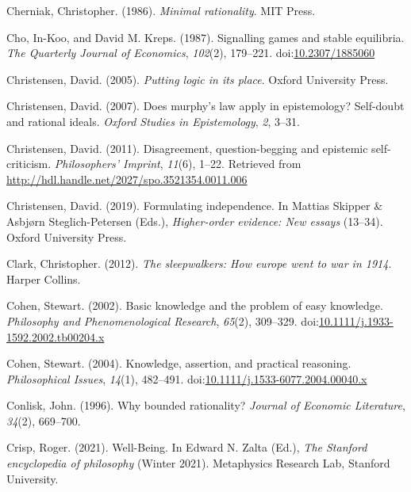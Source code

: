 \documentclass[
  10pt,
  letterpaper,
  twoside]{scrbook}
\newlength{\cslhangindent}
\newenvironment{CSLReferences}[2] %
 {\begin{list}{}{%
  \setlength{\itemindent}{0pt}
  \setlength{\leftmargin}{0pt}
  \setlength{\parsep}{0pt}
  \ifodd #1
   \setlength{\leftmargin}{\cslhangindent}
   \setlength{\itemindent}{-1\cslhangindent}
  \fi
  \setlength{\itemsep}{#2\baselineskip}}}
 {\end{list}}
\begin{document}
\begin{CSLReferences}{1}{0}
Cherniak, Christopher. (1986). \emph{Minimal rationality}. MIT Press.

Cho, In-Koo, and David M. Kreps. (1987). Signalling games and stable
equilibria. \emph{The Quarterly Journal of Economics}, \emph{102}(2),
179--221. doi:\href{https://doi.org/10.2307/1885060}{10.2307/1885060}

Christensen, David. (2005). \emph{Putting logic in its place}. Oxford
University Press.

Christensen, David. (2007). Does murphy's law apply in epistemology?
Self-doubt and rational ideals. \emph{Oxford Studies in Epistemology},
\emph{2}, 3--31.

Christensen, David. (2011). Disagreement, question-begging and epistemic
self-criticism. \emph{Philosophers' Imprint}, \emph{11}(6), 1--22.
Retrieved from \url{http://hdl.handle.net/2027/spo.3521354.0011.006}

Christensen, David. (2019). Formulating independence. In Mattias Skipper
\& Asbjørn Steglich-Petersen (Eds.), \emph{Higher-order evidence: New
essays} (13--34). Oxford University Press.

Clark, Christopher. (2012). \emph{The sleepwalkers: How europe went to
war in 1914}. Harper Collins.

Cohen, Stewart. (2002). Basic knowledge and the problem of easy
knowledge. \emph{Philosophy and Phenomenological Research},
\emph{65}(2), 309--329.
doi:\href{https://doi.org/10.1111/j.1933-1592.2002.tb00204.x}{10.1111/j.1933-1592.2002.tb00204.x}

Cohen, Stewart. (2004). Knowledge, assertion, and practical reasoning.
\emph{Philosophical Issues}, \emph{14}(1), 482--491.
doi:\href{https://doi.org/10.1111/j.1533-6077.2004.00040.x}{10.1111/j.1533-6077.2004.00040.x}

Conlisk, John. (1996). Why bounded rationality? \emph{Journal of
Economic Literature}, \emph{34}(2), 669--700.

Crisp, Roger. (2021). {Well-Being}. In Edward N. Zalta (Ed.), \emph{The
{Stanford} encyclopedia of philosophy} ({W}inter 2021). Metaphysics
Research Lab, Stanford University.


\end{CSLReferences}
\end{document}
